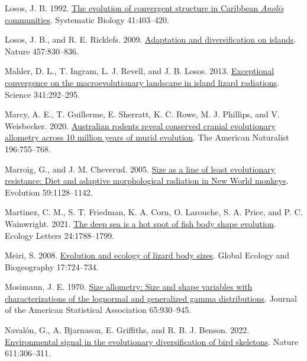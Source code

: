 \documentclass[
  11pt,
]{article}
\newlength{\cslhangindent}
\newlength{\cslentryspacingunit} %
\newenvironment{CSLReferences}[2] %
 {%
  \setlength{\parindent}{0pt}
  \ifodd #1
  \let\oldpar\par
  \def\par{\hangindent=\cslhangindent\oldpar}
  \fi
  \setlength{\parskip}{#2\cslentryspacingunit}
 }%
 {}
\begin{document}
\begin{CSLReferences}{1}{0}
\leavevmode{}%
Losos, J. B. 1992. \href{https://doi.org/10.1093/sysbio/41.4.403}{The
evolution of convergent structure in {C}aribbean \emph{{A}nolis}
communities}. Systematic Biology 41:403--420.

\leavevmode{}%
Losos, J. B., and R. E. Ricklefs. 2009.
\href{https://doi.org/10.1038/nature07893}{Adaptation and
diversification on islands}. Nature 457:830--836.

\leavevmode{}%
Mahler, D. L., T. Ingram, L. J. Revell, and J. B. Losos. 2013.
\href{https://doi.org/10.1126/science.1232392}{Exceptional convergence
on the macroevolutionary landscape in island lizard radiations}. Science
341:292--295.

\leavevmode{}%
Marcy, A. E., T. Guillerme, E. Sherratt, K. C. Rowe, M. J. Phillips, and
V. Weisbecker. 2020. \href{https://doi.org/10.1086/711398}{Australian
rodents reveal conserved cranial evolutionary allometry across 10
million years of murid evolution}. The American Naturalist 196:755--768.

\leavevmode{}%
Marroig, G., and J. M. Cheverud. 2005.
\href{https://doi.org/10.1111/j.0014-3820.2005.tb01049.x}{Size as a line
of least evolutionary resistance: Diet and adaptive morphological
radiation in {N}ew {W}orld monkeys}. Evolution 59:1128--1142.

\leavevmode{}%
Martinez, C. M., S. T. Friedman, K. A. Corn, O. Larouche, S. A. Price,
and P. C. Wainwright. 2021. \href{https://doi.org/10.1111/ele.13785}{The
deep sea is a hot spot of fish body shape evolution}. Ecology Letters
24:1788--1799.

\leavevmode{}%
Meiri, S. 2008.
\href{https://doi.org/10.1111/j.1466-8238.2008.00414.x}{Evolution and
ecology of lizard body sizes}. Global Ecology and Biogeography
17:724--734.

\leavevmode{}%
Mosimann, J. E. 1970.
\href{https://doi.org/10.1080/01621459.1970.10481136}{Size allometry:
Size and shape variables with characterizations of the lognormal and
generalized gamma distributions}. Journal of the American Statistical
Association 65:930--945.

\leavevmode{}%
Navalón, G., A. Bjarnason, E. Griffiths, and R. B. J. Benson. 2022.
\href{https://doi.org/10.1038/s41586-022-05372-y}{{Environmental signal
in the evolutionary diversification of bird skeletons}}. Nature
611:306--311.


\end{CSLReferences}
\end{document}
